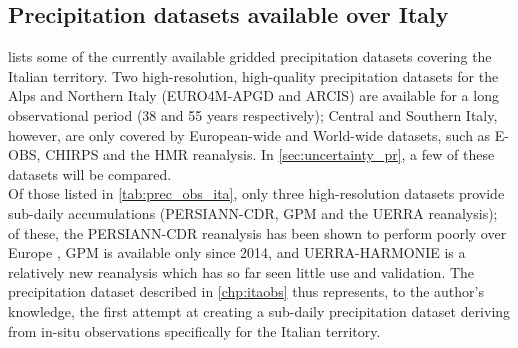 \subsection{Precipitation datasets available over Italy} \label{sec:obs_datasets}
 lists some of the currently available gridded precipitation datasets covering the Italian territory.
Two high-resolution, high-quality precipitation datasets for the Alps and Northern Italy (EURO4M-APGD and ARCIS) are available for a long observational period (38 and 55 years respectively); Central and Southern Italy, however, are only covered by European-wide and World-wide datasets, such as E-OBS, CHIRPS and the HMR reanalysis. In \cref{sec:uncertainty_pr}, a few of these datasets will be compared.\\
Of those listed in \cref{tab:prec_obs_ita}, only three high-resolution datasets provide sub-daily accumulations (PERSIANN-CDR, GPM and the UERRA reanalysis); of these, the PERSIANN-CDR reanalysis has been shown to perform poorly over Europe \citep{Prein2017}, GPM is available only since 2014, and UERRA-HARMONIE is a relatively new reanalysis which has so far seen little use and validation.
The precipitation dataset described in \cref{chp:itaobs} thus represents, to the author's knowledge, the first attempt at creating a sub-daily precipitation dataset deriving from in-situ observations specifically for the Italian territory.

